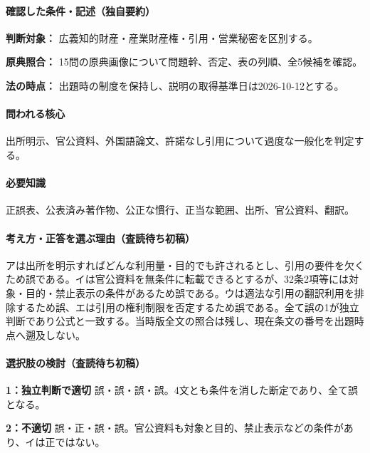 \paragraph{確認した条件・記述（独自要約）}\mbox{}\par

\noindent\textbf{判断対象：} 広義知的財産・産業財産権・引用・営業秘密を区別する。\par

\noindent\textbf{原典照合：} 15問の原典画像について問題幹、否定、表の列順、全5候補を確認。\par

\noindent\textbf{法の時点：} 出題時の制度を保持し、説明の取得基準日は2026-10-12とする。\par

\paragraph{問われる核心} 出所明示、官公資料、外国語論文、許諾なし引用について過度な一般化を判定する。

\paragraph{必要知識} 正誤表、公表済み著作物、公正な慣行、正当な範囲、出所、官公資料、翻訳。

\paragraph{考え方・正答を選ぶ理由（査読待ち初稿）} アは出所を明示すればどんな利用量・目的でも許されるとし、引用の要件を欠くため誤である。イは官公資料を無条件に転載できるとするが、32条2項等には対象・目的・禁止表示の条件があるため誤である。ウは適法な引用の翻訳利用を排除するため誤、エは引用の権利制限を否定するため誤である。全て誤の1が独立判断であり公式と一致する。当時版全文の照合は残し、現在条文の番号を出題時点へ遡及しない。

\paragraph{選択肢の検討（査読待ち初稿）}\mbox{}\par

\noindent\textbf{1：独立判断で適切} 誤・誤・誤・誤。4文とも条件を消した断定であり、全て誤となる。\par

\noindent\textbf{2：不適切} 誤・正・誤・誤。官公資料も対象と目的、禁止表示などの条件があり、イは正ではない。\par

